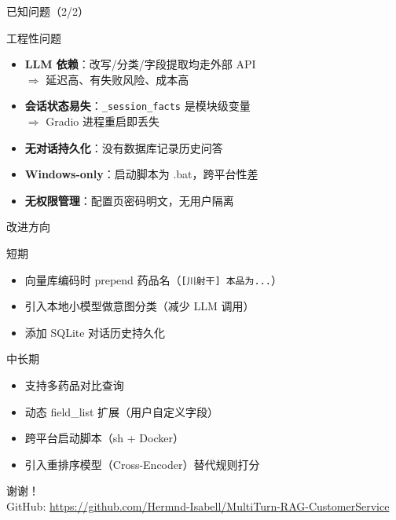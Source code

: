 \documentclass[aspectratio=169,11pt]{beamer}
\begin{document}
\begin{frame}{已知问题（2/2）}
    \begin{alertblock}{工程性问题}
        \begin{itemize}
            \item \textbf{LLM 依赖}：改写/分类/字段提取均走外部 API\\
            $\Rightarrow$ 延迟高、有失败风险、成本高
            \item \textbf{会话状态易失}：\texttt{\_session\_facts} 是模块级变量\\
            $\Rightarrow$ Gradio 进程重启即丢失
            \item \textbf{无对话持久化}：没有数据库记录历史问答
            \item \textbf{Windows-only}：启动脚本为 .bat，跨平台性差
            \item \textbf{无权限管理}：配置页密码明文，无用户隔离
        \end{itemize}
    \end{alertblock}
\end{frame}

\begin{frame}{改进方向}
    \begin{exampleblock}{短期}
        \begin{itemize}
            \item 向量库编码时 prepend 药品名（\texttt{[川射干] 本品为...}）
            \item 引入本地小模型做意图分类（减少 LLM 调用）
            \item 添加 SQLite 对话历史持久化
        \end{itemize}
    \end{exampleblock}
    \begin{exampleblock}{中长期}
        \begin{itemize}
            \item 支持多药品对比查询
            \item 动态 field\_list 扩展（用户自定义字段）
            \item 跨平台启动脚本（sh + Docker）
            \item 引入重排序模型（Cross-Encoder）替代规则打分
        \end{itemize}
    \end{exampleblock}
\end{frame}

\begin{frame}
    \centering
    \Huge 谢谢！
    \vspace{1em}
    \\
    \normalsize
    GitHub: \url{https://github.com/Hermnd-Isabell/MultiTurn-RAG-CustomerService}
\end{frame}
\end{document}
